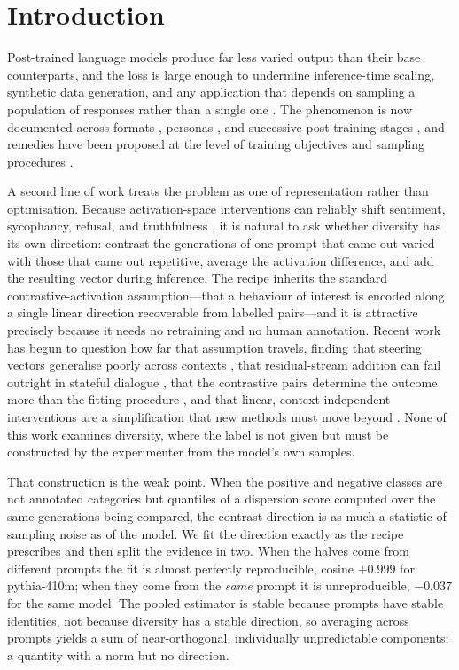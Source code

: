 \section{Introduction}

Post-trained language models produce far less varied output than their base counterparts, and the
loss is large enough to undermine inference-time scaling, synthetic data generation, and any
application that depends on sampling a population of responses rather than a single one
\citep{karouzos2026where,matthews2026language,yun2025price}. The phenomenon is now documented
across formats \citep{parikh2026structured}, personas \citep{xiao2026chameleons}, and successive
post-training stages \citep{liu2026representation}, and remedies have been proposed at the level
of training objectives \citep{li2025jointly} and sampling procedures \citep{xu2026prism}.

A second line of work treats the problem as one of representation rather than optimisation.
Because activation-space interventions can reliably shift sentiment, sycophancy, refusal, and
truthfulness \citep{turner2023steering,rimsky2024steering,zhao2025steering}, it is natural to
ask whether diversity has its own direction: contrast the generations of one prompt that came out
varied with those that came out repetitive, average the activation difference, and add the
resulting vector during inference. The recipe inherits the standard contrastive-activation
assumption---that a behaviour of interest is encoded along a single linear direction recoverable
from labelled pairs---and it is attractive precisely because it needs no retraining and no human
annotation. Recent work has begun to question how far that assumption travels, finding that
steering vectors generalise poorly across contexts \citep{tan2024analyzing}, that residual-stream
addition can fail outright in stateful dialogue \citep{kang2026promptactivation}, that the
contrastive pairs determine the outcome more than the fitting procedure
\citep{bohek2026detecting,hao2025patterns}, and that linear, context-independent interventions are
a simplification that new methods must move beyond \citep{jafari2026metasteer,park2026information}.
None of this work examines diversity, where the label is not given but must be constructed by the
experimenter from the model's own samples.

That construction is the weak point. When the positive and negative classes are not annotated
categories but quantiles of a dispersion score computed over the same generations being compared,
the contrast direction is as much a statistic of sampling noise as of the model. We fit the
direction exactly as the recipe prescribes and then split the evidence in two. When the halves come
from different prompts the fit is almost perfectly reproducible, cosine $+0.999$ for pythia-410m;
when they come from the \emph{same} prompt it is unreproducible, $-0.037$ for the same model. The
pooled estimator is stable because prompts have stable identities, not because diversity has a
stable direction, so averaging across prompts yields a sum of near-orthogonal, individually
unpredictable components: a quantity with a norm but no direction.

